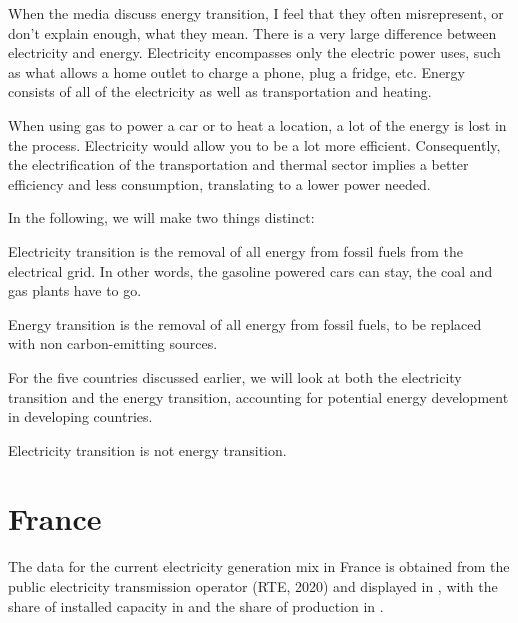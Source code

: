 When the media discuss energy transition, I feel that they often misrepresent, or don't explain enough, what they mean. There is a very large difference between electricity and energy. Electricity encompasses only the electric power uses, such as what allows a home outlet to charge a phone, plug a fridge, etc. Energy consists of all of the electricity as well as transportation and heating.

When using gas to power a car or to heat a location, a lot of the energy is lost in the process. Electricity would allow you to be a lot more efficient. Consequently, the electrification of the transportation and thermal sector implies a better efficiency and less consumption, translating to a lower power needed.

In the following, we will make two things distinct:


\begin{kaobox}[frametitle=Electricity Transition]
Electricity transition is the removal of all energy from fossil fuels from the electrical grid. In other words, the gasoline powered cars can stay, the coal and gas plants have to go.
\end{kaobox}

\begin{kaobox}[frametitle=Energy Transition]
Energy transition is the removal of all energy from fossil fuels, to be replaced with non carbon-emitting sources.
\end{kaobox}


For the five countries discussed earlier, we will look at both the electricity transition and the energy transition, accounting for potential energy development in developing countries.

Electricity transition is not energy transition.


\section{France}

The data for the current electricity generation mix in France is obtained from the public electricity transmission operator (RTE, 2020) and displayed in , with the share of installed capacity in  and the share of production in .

